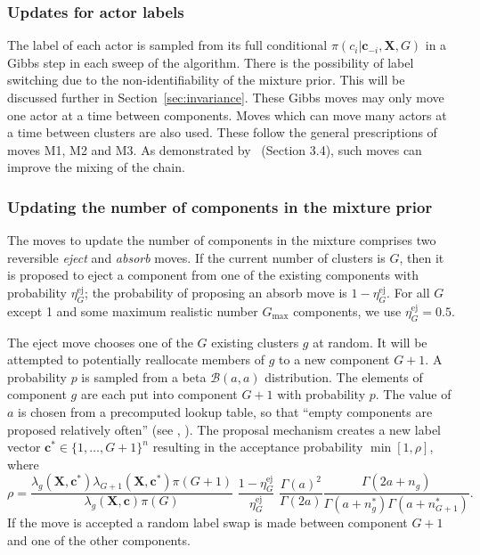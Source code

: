 \documentclass[12pt]{article}
\newcommand{\bX}{{\mathbf{X}}}
\newcommand{\bc}{{\mathbf{c}}}
\begin{document}
\subsubsection{ Updates for actor labels }

The label of each actor is sampled from its full conditional
$
\pi(c_i|\bc_{-i},\bX, G)
$ 
in a Gibbs step in each sweep of the algorithm. There is the possibility of label switching due to the non-identifiability of the mixture prior. This will be discussed further in Section~\ref{sec:invariance}. These Gibbs moves may only move one actor at a time between components. Moves which can move many actors at a time between clusters are also used. These follow the general prescriptions of  moves M1, M2 and M3.  As demonstrated by~ (Section 3.4), such moves can improve the mixing of the chain. 

\subsubsection{Updating the number of components in the mixture prior}

The moves to update the number of components in the mixture comprises two reversible {\it eject} and {\it absorb} moves. If the current number of clusters is $G$, then it is proposed to eject a component from one of the existing components with probability $\eta_G^{\mathrm{ej}}$; the probability of proposing an absorb move is $1-\eta_G^{\mathrm{ej}}$. For all $G$ except 1 and some maximum realistic number $G_{\mathrm{max}}$ components, we use $\eta_G^{\mathrm{ej}} = 0.5$.

The eject move chooses one of the $G$ existing clusters $g$ at random. It will be attempted to potentially reallocate members of $g$ to a new component $G+1$. A probability $p$ is sampled from a beta $\mathcal{B}(a,a)$ distribution. The elements of component $g$ are each put into component $G+1$ with probability $p$. The value of $a$ is chosen from a precomputed lookup table, so that ``empty components are proposed relatively often'' (see , ). The proposal mechanism creates a new label vector $\bc^* \in \{1,\dots,G+1\}^n$ resulting in the acceptance probability $\min[1,\rho]$, where 
\[
\rho = \frac{\lambda_{g}(\bX,\bc^*) \lambda_{G+1}(\bX,\bc^*) \pi(G+1)}{\lambda_g(\bX,\bc) \pi(G) }\,\,\frac{1-\eta_{G}^{\mathrm{ej}}}{\eta_{G}^{\mathrm{ej}}} \,\,\frac{\Gamma(a)^2}{\Gamma(2a)} \frac{ \Gamma( 2a + n_g)}{\Gamma(a + n_g^*)\Gamma(a + n_{G+1}^*)}.
\]
If the move is accepted a random label swap is made between component $G+1$ and one of the other components. 
\end{document}
